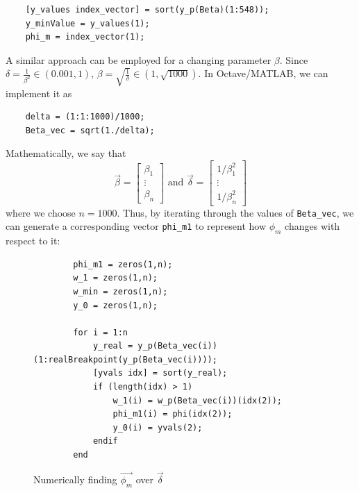 \documentclass[11pt]{article}
\begin{document}
\begin{verbatim}
    [y_values index_vector] = sort(y_p(Beta)(1:548));
    y_minValue = y_values(1);
    phi_m = index_vector(1);
\end{verbatim}

A similar approach can be employed for a changing parameter $\beta$. 
Since $\delta=\frac{1}{\beta^2}\in (0.001,1)$, $\beta=\sqrt{\frac{1}{\delta}}\in (1,\sqrt{1000})$.
In Octave/MATLAB, we can implement it as

\begin{verbatim}
    delta = (1:1:1000)/1000;
    Beta_vec = sqrt(1./delta);
\end{verbatim}

Mathematically, we say that 
\begin{equation}
\vec\beta=\begin{bmatrix}\beta_1\\\vdots\\\beta_n\end{bmatrix}\text{ and }\vec{\delta}=\begin{bmatrix}1/\beta_1^2\\\vdots\\1/\beta_n^2\end{bmatrix}
\label{paravectors}
\end{equation}
where we choose $n=1000$.
Thus, by iterating through the values of \verb|Beta_vec|, we can generate a corresponding vector \verb|phi_m1| to represent how $\phi_m$ changes with respect to it:

\begin{figure}[H]
    \begin{verbatim}
        phi_m1 = zeros(1,n);
        w_1 = zeros(1,n);
        w_min = zeros(1,n);
        y_0 = zeros(1,n);
    
        for i = 1:n
            y_real = y_p(Beta_vec(i))(1:realBreakpoint(y_p(Beta_vec(i))));
            [yvals idx] = sort(y_real);
            if (length(idx) > 1)
                w_1(i) = w_p(Beta_vec(i))(idx(2));
                phi_m1(i) = phi(idx(2));
                y_0(i) = yvals(2);
            endif
        end
    \end{verbatim}
    \caption{Numerically finding $\vec{\phi_m}$ over $\vec{\delta}$}\label{loop1}
\end{figure}
\end{document}
